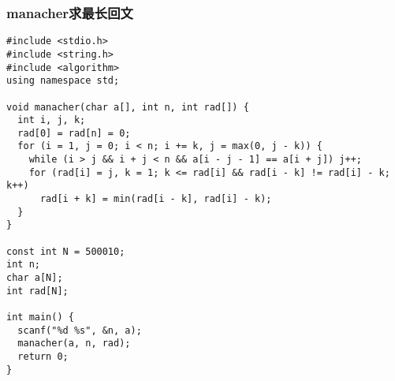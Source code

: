 \subsubsection{manacher求最长回文}
\begin{verbatim}
#include <stdio.h>
#include <string.h>
#include <algorithm>
using namespace std;

void manacher(char a[], int n, int rad[]) {
  int i, j, k;
  rad[0] = rad[n] = 0;
  for (i = 1, j = 0; i < n; i += k, j = max(0, j - k)) {
    while (i > j && i + j < n && a[i - j - 1] == a[i + j]) j++;
    for (rad[i] = j, k = 1; k <= rad[i] && rad[i - k] != rad[i] - k; k++)
      rad[i + k] = min(rad[i - k], rad[i] - k);
  }
}

const int N = 500010;
int n;
char a[N];
int rad[N];

int main() {
  scanf("%d %s", &n, a);
  manacher(a, n, rad);
  return 0;
}
\end{verbatim}

